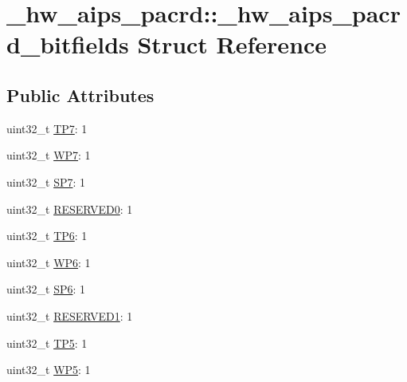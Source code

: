 \hypertarget{struct__hw__aips__pacrd_1_1__hw__aips__pacrd__bitfields}{}\section{\+\_\+hw\+\_\+aips\+\_\+pacrd\+:\+:\+\_\+hw\+\_\+aips\+\_\+pacrd\+\_\+bitfields Struct Reference}
\label{struct__hw__aips__pacrd_1_1__hw__aips__pacrd__bitfields}
\subsection*{Public Attributes}
\begin{DoxyCompactItemize}
\item 
uint32\+\_\+t \hyperlink{struct__hw__aips__pacrd_1_1__hw__aips__pacrd__bitfields_aeef80e74b446057ab33056ca3094a33a}{T\+P7}\+: 1
\item 
uint32\+\_\+t \hyperlink{struct__hw__aips__pacrd_1_1__hw__aips__pacrd__bitfields_a8dbc48044106877edda960848ca00dcf}{W\+P7}\+: 1
\item 
uint32\+\_\+t \hyperlink{struct__hw__aips__pacrd_1_1__hw__aips__pacrd__bitfields_ae6b97983e0960c0ae4fbba2f1dbd3fed}{S\+P7}\+: 1
\item 
uint32\+\_\+t \hyperlink{struct__hw__aips__pacrd_1_1__hw__aips__pacrd__bitfields_a02fbd6f84dc2ac37358736ac04c2fc69}{R\+E\+S\+E\+R\+V\+E\+D0}\+: 1
\item 
uint32\+\_\+t \hyperlink{struct__hw__aips__pacrd_1_1__hw__aips__pacrd__bitfields_ae44ddc1902cda92ffdebe7002365a289}{T\+P6}\+: 1
\item 
uint32\+\_\+t \hyperlink{struct__hw__aips__pacrd_1_1__hw__aips__pacrd__bitfields_aa01efa490a23bfc3419a9e79118428ea}{W\+P6}\+: 1
\item 
uint32\+\_\+t \hyperlink{struct__hw__aips__pacrd_1_1__hw__aips__pacrd__bitfields_aae02cb7dbe20ae44175ab0f8bb339288}{S\+P6}\+: 1
\item 
uint32\+\_\+t \hyperlink{struct__hw__aips__pacrd_1_1__hw__aips__pacrd__bitfields_a575c4c081c88326d56ec0353b3dc3642}{R\+E\+S\+E\+R\+V\+E\+D1}\+: 1
\item 
uint32\+\_\+t \hyperlink{struct__hw__aips__pacrd_1_1__hw__aips__pacrd__bitfields_ab90f669abf98ca0e0a9303be3cba8278}{T\+P5}\+: 1
\item 
uint32\+\_\+t \hyperlink{struct__hw__aips__pacrd_1_1__hw__aips__pacrd__bitfields_a0c45c95f197120d0207e831c3fe8c801}{W\+P5}\+: 1

\end{DoxyCompactItemize}
